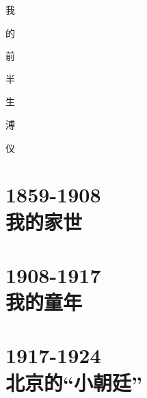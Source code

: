 \documentclass[oneside,openright,headings=optiontohead]{scrbook}
\begin{document}
\begin{figure}[ht]
\begin{center}

\end{center}
\end{figure}
\newpage
\begin{flushright}
{\Huge 我}

{\Huge 的}

{\Huge 前}

{\Huge 半}

{\Huge 生}

\vspace{1cm}

{\LARGE 溥}

{\LARGE 仪}
\end{flushright}
\newpage
{\color{TEXTColor}
\tableofcontents
\thispagestyle{empty}
\newpage
\part{1859-1908\\\hspace{1cm}我的家世}





\part{1908-1917\\\hspace{1cm}我的童年}






\part{1917-1924\\\hspace{1cm}北京的“小朝廷”}













}
\end{document}
